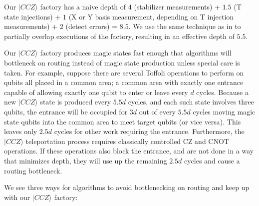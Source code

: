 \documentclass[superscriptaddress,notitlepage,longbibliography]{revtex4-1}
\begin{document}
Our $|CCZ\rangle$ factory has a naive depth of $4$ (stabilizer measurements) + $1.5$ (T state injections) + $1$ (X or Y basis measurement, depending on T injection measurements) + $2$ (detect errors) = $8.5$.
We use the same technique as in \cite{fowler2018} to partially overlap executions of the factory, resulting in an effective depth of $5.5$.

Our $|CCZ\rangle$ factory produces magic states fast enough that algorithms will bottleneck on routing instead of magic state production unless special care is taken.
For example, suppose there are several Toffoli operations to perform on qubits all placed in a common area; a common area with exactly one entrance capable of allowing exactly one qubit to enter or leave every $d$ cycles.
Because a new $|CCZ\rangle$ state is produced every $5.5d$ cycles, and each such state involves three qubits, the entrance will be occupied for $3d$ out of every $5.5d$ cycles moving magic state qubits into the common area to meet target qubits (or vice versa). This leaves only $2.5d$ cycles for other work requiring the entrance.
Furthermore, the $|CCZ\rangle$ teleportation process requires classically controlled CZ and CNOT operations.
If these operations also block the entrance, and are not done in a way that minimizes depth, they will use up the remaining $2.5d$ cycles and cause a routing bottleneck.

We see three ways for algorithms to avoid bottlenecking on routing and keep up with our $|CCZ\rangle$ factory:
\end{document}
